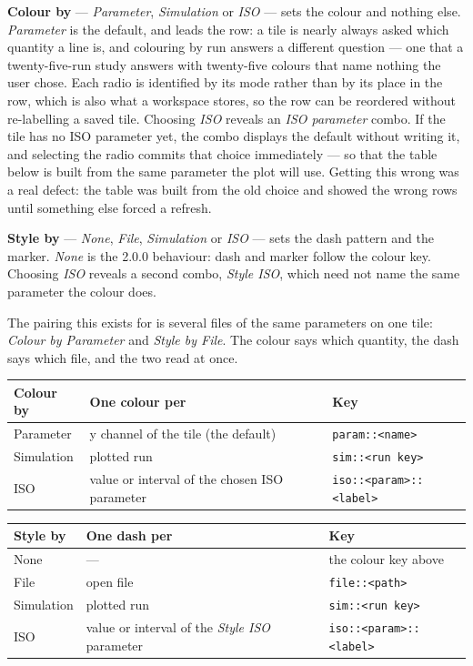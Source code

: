 \documentclass[11pt,a4paper,oneside]{report}
\newcommand{\code}[1]{\texttt{#1}}
\begin{document}
\textbf{Colour by} --- \emph{Parameter}, \emph{Simulation} or \emph{ISO} --- sets
the colour and nothing else. \emph{Parameter} is the default, and leads the
row: a tile is nearly always asked which quantity a line is, and colouring by
run answers a different question --- one that a twenty-five-run study answers
with twenty-five colours that name nothing the user chose. Each radio is
identified by its mode rather than by its place in the row, which is also what
a workspace stores, so the row can be reordered without re-labelling a saved
tile. Choosing \emph{ISO} reveals an \emph{ISO parameter}
combo. If the tile has no ISO parameter yet, the combo displays the default
without writing it, and selecting the radio commits that choice immediately ---
so that the table below is built from the same parameter the plot will use.
Getting this wrong was a real defect: the table was built from the old choice and
showed the wrong rows until something else forced a refresh.

\textbf{Style by} --- \emph{None}, \emph{File}, \emph{Simulation} or \emph{ISO}
--- sets the dash pattern and the marker. \emph{None} is the 2.0.0 behaviour:
dash and marker follow the colour key. Choosing \emph{ISO} reveals a second
combo, \emph{Style ISO}, which need not name the same parameter the colour does.

The pairing this exists for is several files of the same parameters on one tile:
\emph{Colour by Parameter} and \emph{Style by File}. The colour says which
quantity, the dash says which file, and the two read at once.

\begin{center}
\small
\begin{tabular}{@{}lp{}p{}@{}}
\toprule
\textbf{Colour by} & \textbf{One colour per} & \textbf{Key} \\
\midrule
Parameter & y channel of the tile (the default) & \code{param::<name>} \\
Simulation & plotted run & \code{sim::<run key>} \\
ISO & value or interval of the chosen ISO parameter & \code{iso::<param>::<label>} \\
\bottomrule
\end{tabular}

\vspace{8pt}

\begin{tabular}{@{}lp{}p{}@{}}
\toprule
\textbf{Style by} & \textbf{One dash per} & \textbf{Key} \\
\midrule
None & --- & the colour key above \\
File & open file & \code{file::<path>} \\
Simulation & plotted run & \code{sim::<run key>} \\
ISO & value or interval of the \emph{Style ISO} parameter & \code{iso::<param>::<label>} \\
\bottomrule
\end{tabular}
\end{center}
\end{document}
